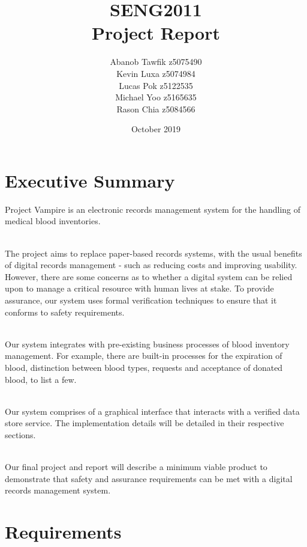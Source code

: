 \documentclass{article}
\title{SENG2011\\Project Report}
\author{Abanob Tawfik z5075490\\
        Kevin Luxa z5074984\\
        Lucas Pok z5122535\\
        Michael Yoo z5165635\\
        Rason Chia z5084566
}
\date{October 2019}
\newcommand*\fixindent{ \hspace{1pt}\\}
\begin{document}
\maketitle
\section{Executive Summary}
Project Vampire is an electronic records management system for the handling of medical blood inventories.

\fixindent{}The project aims to replace paper-based records systems, with the usual benefits of digital records management - such as reducing costs and improving usability. However, there are some concerns as to whether a digital system can be relied upon to manage a critical resource with human lives at stake. To provide assurance, our system uses formal verification techniques to ensure that it conforms to safety requirements.

\fixindent{}Our system integrates with pre-existing business processes of blood inventory management. For example, there are built-in processes for the expiration of blood, distinction between blood types, requests and acceptance of donated blood, to list a few.

\fixindent{}Our system comprises of a graphical interface that interacts with a verified data store service. The implementation details will be detailed in their respective sections.

\fixindent{}Our final project and report will describe a minimum viable product to demonstrate that safety and assurance requirements can be met with a digital records management system.

\newpage

\section{Requirements}
\end{document}
